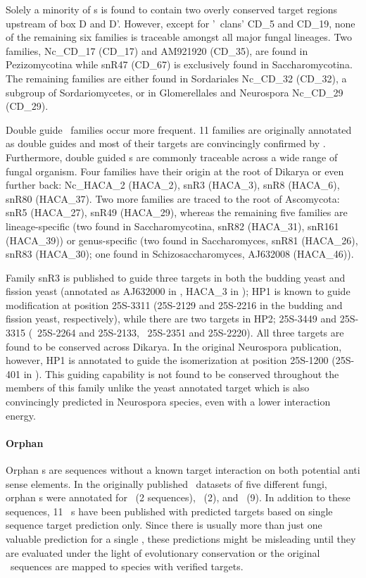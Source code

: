 Solely a minority of \cd s is found to contain two overly conserved
target regions upstream of box D and D'. However, except for '\sno\
clans' CD\_5 and CD\_19, none of the remaining six families is
traceable amongst all major fungal lineages. Two families, Nc\_CD\_17
(CD\_17) and AM921920 (CD\_35), are found in Pezizomycotina while
snR47 (CD\_67) is exclusively found in Saccharomycotina. The remaining
families are either found in Sordariales Nc\_CD\_32 (CD\_32), a
subgroup of Sordariomycetes, or in Glomerellales and Neurospora
Nc\_CD\_29 (CD\_29).

Double guide \haca\ families occur more frequent. 11 families are
originally annotated as double guides and most of their targets are
convincingly confirmed by \snostrip. Furthermore, double guided \haca
s are commonly traceable across a wide range of fungal organism. Four
families have their origin at the root of Dikarya or even further
back: Nc\_HACA\_2 (HACA\_2), snR3 (HACA\_3), snR8 (HACA\_6), snR80
(HACA\_37). Two more families are traced to the root of Ascomycota:
snR5 (HACA\_27), snR49 (HACA\_29), whereas the remaining five families
are lineage-specific (two found in Saccharomycotina, snR82 (HACA\_31),
snR161 (HACA\_39)) or genus-specific (two found in Saccharomyces,
snR81 (HACA\_26), snR83 (HACA\_30); one found in Schizosaccharomyces,
AJ632008 (HACA\_46)).

Family snR3 is published to guide three targets in both the budding
yeast and fission yeast (annotated as AJ632000 in \spo, HACA\_3 in
\snostrip); HP1 is known to guide modification at position 25S-3311
(25S-2129 and 25S-2216 in the budding and fission yeast,
respectively), while there are two targets in HP2; 25S-3449 and
25S-3315 (\sce\ 25S-2264 and 25S-2133, \spo\ 25S-2351 and
25S-2220). All three targets are found to be conserved across
Dikarya. In the original Neurospora publication, however, HP1 is
annotated to guide the isomerization at position 25S-1200 (25S-401 in
\Ncr). This guiding capability is not found to be conserved throughout
the members of this family unlike the yeast annotated target which is
also convincingly predicted in Neurospora species, even with a lower
interaction energy.

\paragraph{\textbf{Orphan \sno}}
Orphan \sno s are sequences without a known target interaction on both
potential anti sense elements. In the originally published \sno\
datasets of five different fungi, orphan \cd s were annotated for
\sce\ (2 sequences), \ncr\ (2), and \afu\ (9). In addition to these
sequences, 11 \ncr\ \sno s have been published with predicted targets
based on single sequence target prediction only. Since there is
usually more than just one valuable prediction for a single \sno,
these predictions might be misleading until they are evaluated under
the light of evolutionary conservation or the original \sno\ sequences
are mapped to species with verified targets.

